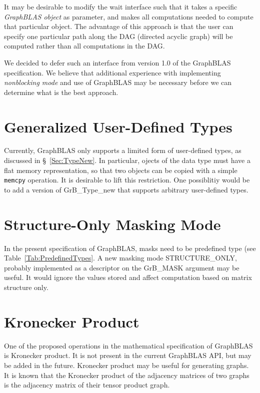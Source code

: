 It may be desirable to modify the {\sf wait} interface such that it takes a specific \emph{GraphBLAS object} as parameter, and makes all computations needed to compute that particular object. The advantage of this approach is that the user can specify one particular path along the DAG (directed acyclic graph) will be computed rather than all computations in the DAG.

We decided to defer such an interface from version 1.0 of the GraphBLAS specification. We believe that additional experience with implementing \emph{nonblocking mode} and use of GraphBLAS may be necessary before we can determine what is the best approach.


\section{Generalized User-Defined Types}

Currently, GraphBLAS only supports a limited form of user-defined types, as discussed in \S~\ref{Sec:TypeNew}. In particular, ojects of the
data type must have a flat memory representation, so that two objects can be copied with a simple {\tt memcpy} operation. 
It is desirable to lift this restriction. One possiblitiy would be to add a version of {\sf GrB\_Type\_new} that supports
arbitrary user-defined types.

\section{Structure-Only Masking Mode}

 In the present specification of GraphBLAS, masks need to be predefined type (see Table~\ref{Tab:PredefinedTypes}. A new masking mode {\sf STRUCTURE\_ONLY}, probably implemented as a descriptor on the {\sf GrB\_MASK} argument may be useful. It would ignore the values stored and affect computation based on matrix structure only.
 
 \section{Kronecker Product}

One of the proposed operations in the mathematical specification of GraphBLAS is Kronecker product. It is not present in the current GraphBLAS API, but may be added in the future. Kronecker product may be useful for generating graphs. It is known that the Kronecker product of the adjacency matrices of two graphs is the adjacency matrix of their tensor product graph.

